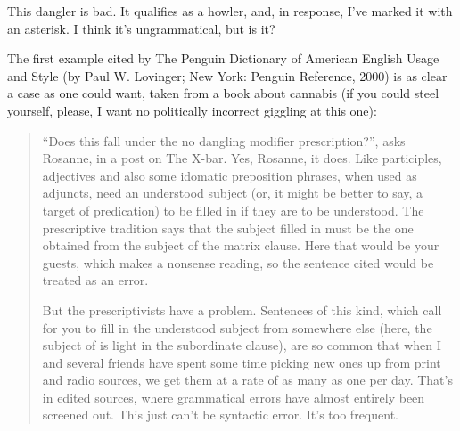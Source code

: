 \label{ex:erection}
\z

This dangler is bad. It qualifies as a howler, and, in response, I've marked it with an asterisk. I think it's ungrammatical, but is it?

The first example cited by The Penguin Dictionary of American English Usage and Style (by Paul W. Lovinger; New York: Penguin Reference, 2000) is as clear a case as one could want, taken from a book about cannabis (if you could steel yourself, please, I want no politically incorrect giggling at this one):

\ea
 \z
\z

\begin{quote}
\enquote{Does this fall under the no dangling modifier prescription?}, asks Rosanne, in a post on The X-bar. Yes, Rosanne, it does. Like participles, adjectives and also some idomatic preposition phrases, when used as adjuncts, need an understood subject (or, it might be better to say, a target of predication) to be filled in if they are to be understood. The prescriptive tradition says that the subject filled in must be the one obtained from the subject of the matrix clause. Here that would be your guests, which makes a nonsense reading, so the sentence cited would be treated as an error.

But the prescriptivists have a problem. Sentences of this kind, which call for you to fill in the understood subject from somewhere else (here, the subject of is light in the subordinate clause), are so common that when I and several friends have spent some time picking new ones up from print and radio sources, we get them at a rate of as many as one per day. That's in edited sources, where grammatical errors have almost entirely been screened out. This just can't be syntactic error. It's too frequent.\hfill\citep{LanguageLog218}
\end{quote}

